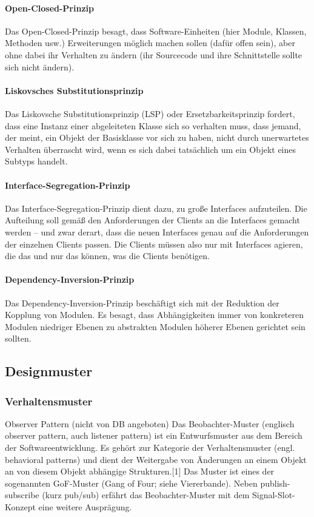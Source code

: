 \paragraph{Open-Closed-Prinzip}
Das Open-Closed-Prinzip besagt, dass Software-Einheiten (hier Module, Klassen, Methoden usw.) Erweiterungen möglich machen sollen (dafür offen sein), aber ohne dabei ihr Verhalten zu ändern (ihr Sourcecode und ihre Schnittstelle sollte sich nicht ändern).

\paragraph{Liskovsches Substitutionsprinzip}
Das Liskovsche Substitutionsprinzip (LSP) oder Ersetzbarkeitsprinzip fordert, dass eine Instanz einer abgeleiteten Klasse sich so verhalten muss, dass jemand, der meint, ein Objekt der Basisklasse vor sich zu haben, nicht durch unerwartetes Verhalten überrascht wird, wenn es sich dabei tatsächlich um ein Objekt eines Subtyps handelt.

\paragraph{Interface-Segregation-Prinzip}
Das Interface-Segregation-Prinzip dient dazu, zu große Interfaces aufzuteilen. Die Aufteilung soll gemäß den Anforderungen der Clients an die Interfaces gemacht werden – und zwar derart, dass die neuen Interfaces genau auf die Anforderungen der einzelnen Clients passen. Die Clients müssen also nur mit Interfaces agieren, die das und nur das können, was die Clients benötigen.

\paragraph{Dependency-Inversion-Prinzip}
Das Dependency-Inversion-Prinzip beschäftigt sich mit der Reduktion der Kopplung von Modulen. Es besagt, dass Abhängigkeiten immer von konkreteren Modulen niedriger Ebenen zu abstrakten Modulen höherer Ebenen gerichtet sein sollten.


\subsection{Designmuster}

\subsubsection{Verhaltensmuster}
Observer Pattern (nicht von DB angeboten)
Das Beobachter-Muster (englisch observer pattern, auch listener pattern) ist ein Entwurfsmuster aus dem Bereich der Softwareentwicklung. Es gehört zur Kategorie der Verhaltensmuster (engl. behavioral patterns) und dient der Weitergabe von Änderungen an einem Objekt an von diesem Objekt abhängige Strukturen.[1] Das Muster ist eines der sogenannten GoF-Muster (Gang of Four; siehe Viererbande).
Neben publish-subscribe (kurz pub/sub) erfährt das Beobachter-Muster mit dem Signal-Slot-Konzept eine weitere Ausprägung. 

